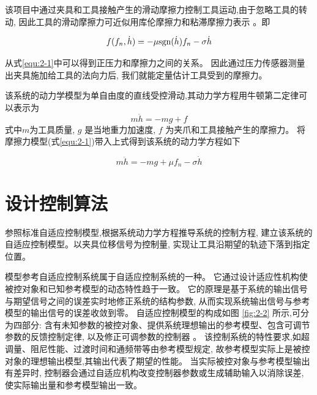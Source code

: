 该项目中通过夹具和工具接触产生的滑动摩擦力控制工具运动,由于忽略工具的转动,
因此工具的滑动摩擦力可近似用库伦摩擦力和粘滞摩擦力表示 \cite{ref9}。即

\begin{equation}
  f({f_n},\dot h) =  - \mu {\mathop{\rm sgn}} (\dot h){f_n} - \sigma \dot h
  \label{equ:2-1}
\end{equation}

\begin{note}
\end{note}

从式\ref{equ:2-1}中可以得到正压力和摩擦力之间的关系。
因此通过压力传感器测量出夹具施加给工具的法向力后,
我们就能定量估计工具受到的摩擦力。

该系统的动力学模型为单自由度的直线受控滑动,其动力学方程用牛顿第二定律可以表示为
\begin{equation}
  m\ddot h =  - mg + f
  \label{equ:2-2}
\end{equation}
\noindent 式中$m$为工具质量, $g$ 是当地重力加速度, $f$ 为夹爪和工具接触产生的摩擦力。
将摩擦力模型(式\ref{equ:2-1})带入上式得到该系统的动力学方程如下

\begin{equation}
  m\ddot h =  - mg + \mu {f_n} - \sigma \dot h
  \label{equ:2-3}
\end{equation}


\section{设计控制算法}
参照标准自适应控制模型,根据系统动力学方程推导系统的控制方程,
建立该系统的自适应控制模型。以夹具位移信号为控制量,
实现让工具沿期望的轨迹下落到指定位置。

模型参考自适应控制系统属于自适应控制系统的一种。
它通过设计适应性机构使被控对象和已知参考模型的动态特性趋于一致。
它的原理是基于系统的输出信号与期望信号之间的误差实时地修正系统的结构参数,
从而实现系统输出信号与参考模型的输出信号的误差收敛到零。
自适应控制模型的构成如图 \ref{fig:2-2} 所示,可分为四部分:
含有未知参数的被控对象、提供系统理想输出的参考模型、包含可调节参数的反馈控制定律,
以及修正可调参数的控制器 \cite{ref10} 。
该控制系统的特性要求,如超调量、阻尼性能、过渡时间和通频带等由参考模型规定,
故参考模型实际上是被控对象的理想输出模型,其输出代表了期望的性能。
当实际被控对象与参考模型输出有差异时,
控制器会通过自适应机构改变控制器参数或生成辅助输入以消除误差,
使实际输出量和参考模型输出一致。

